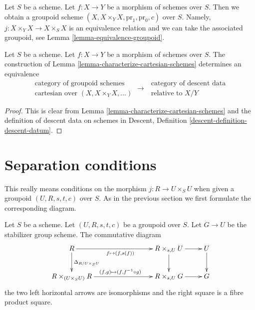 \noindent
Let $S$ be a scheme. Let $f : X \to Y$ be a morphism of schemes over $S$. Then
we obtain a groupoid scheme $(X, X \times_Y X, \text{pr}_1, \text{pr}_0, c)$
over $S$. Namely, $j : X \times_Y X \to X \times_S X$ is an equivalence
relation and we can take the associated groupoid, see
Lemma \ref{lemma-equivalence-groupoid}.

\begin{lemma}
\label{lemma-cartesian-equivalent-descent-datum}
Let $S$ be a scheme. Let $f : X \to Y$ be a morphism of schemes over $S$.
The construction of Lemma \ref{lemma-characterize-cartesian-schemes}
determines an equivalence
$$
\begin{matrix}
\text{category of groupoid schemes} \\
\text{cartesian over } (X, X \times_Y X, \ldots)
\end{matrix}
\longrightarrow
\begin{matrix}
\text{ category of descent data} \\
\text{ relative to } X/Y
\end{matrix}
$$
\end{lemma}

\begin{proof}
This is clear from
Lemma \ref{lemma-characterize-cartesian-schemes}
and the definition of descent data on schemes in
Descent, Definition \ref{descent-definition-descent-datum}.
\end{proof}







\section{Separation conditions}
\label{section-separation}

\noindent
This really means conditions on the morphism $j : R \to U \times_S U$
when given a groupoid $(U, R, s, t, c)$ over $S$. As in the previous
section we first formulate the corresponding diagram.

\begin{lemma}
\label{lemma-diagram-diagonal}
Let $S$ be a scheme.
Let $(U, R, s, t, c)$ be a groupoid over $S$.
Let $G \to U$ be the stabilizer group scheme.
The commutative diagram
$$
\xymatrix{
R \ar[d]^{\Delta_{R/U \times_S U}} \ar[rrr]_{f \mapsto (f, s(f))} & & &
R \times_{s, U} U \ar[d] \ar[r] & U \ar[d] \\
R \times_{(U \times_S U)} R \ar[rrr]^{(f, g) \mapsto (f, f^{-1} \circ g)} & & &
R \times_{s, U} G \ar[r] & G
}
$$
the two left horizontal arrows are isomorphisms
and the right square is a fibre product square.
\end{lemma}

